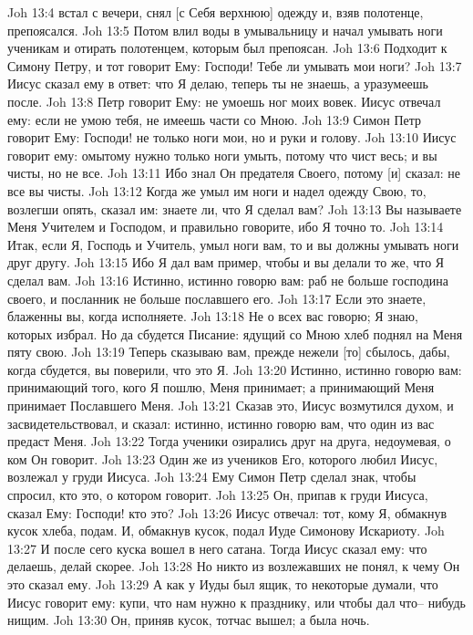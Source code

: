 Joh 13:4  встал с вечери, снял [с Себя верхнюю] одежду и, взяв полотенце, препоясался.
Joh 13:5  Потом влил воды в умывальницу и начал умывать ноги ученикам и отирать полотенцем, которым был препоясан.
Joh 13:6  Подходит к Симону Петру, и тот говорит Ему: Господи! Тебе ли умывать мои ноги?
Joh 13:7  Иисус сказал ему в ответ: что Я делаю, теперь ты не знаешь, а уразумеешь после.
Joh 13:8  Петр говорит Ему: не умоешь ног моих вовек. Иисус отвечал ему: если не умою тебя, не имеешь части со Мною.
Joh 13:9  Симон Петр говорит Ему: Господи! не только ноги мои, но и руки и голову.
Joh 13:10  Иисус говорит ему: омытому нужно только ноги умыть, потому что чист весь; и вы чисты, но не все.
Joh 13:11  Ибо знал Он предателя Своего, потому [и] сказал: не все вы чисты.
Joh 13:12  Когда же умыл им ноги и надел одежду Свою, то, возлегши опять, сказал им: знаете ли, что Я сделал вам?
Joh 13:13  Вы называете Меня Учителем и Господом, и правильно говорите, ибо Я точно то.
Joh 13:14  Итак, если Я, Господь и Учитель, умыл ноги вам, то и вы должны умывать ноги друг другу.
Joh 13:15  Ибо Я дал вам пример, чтобы и вы делали то же, что Я сделал вам.
Joh 13:16  Истинно, истинно говорю вам: раб не больше господина своего, и посланник не больше пославшего его.
Joh 13:17  Если это знаете, блаженны вы, когда исполняете.
Joh 13:18  Не о всех вас говорю; Я знаю, которых избрал. Но да сбудется Писание: ядущий со Мною хлеб поднял на Меня пяту свою.
Joh 13:19  Теперь сказываю вам, прежде нежели [то] сбылось, дабы, когда сбудется, вы поверили, что это Я.
Joh 13:20  Истинно, истинно говорю вам: принимающий того, кого Я пошлю, Меня принимает; а принимающий Меня принимает Пославшего Меня.
Joh 13:21  Сказав это, Иисус возмутился духом, и засвидетельствовал, и сказал: истинно, истинно говорю вам, что один из вас предаст Меня.
Joh 13:22  Тогда ученики озирались друг на друга, недоумевая, о ком Он говорит.
Joh 13:23  Один же из учеников Его, которого любил Иисус, возлежал у груди Иисуса.
Joh 13:24  Ему Симон Петр сделал знак, чтобы спросил, кто это, о котором говорит.
Joh 13:25  Он, припав к груди Иисуса, сказал Ему: Господи! кто это?
Joh 13:26  Иисус отвечал: тот, кому Я, обмакнув кусок хлеба, подам. И, обмакнув кусок, подал Иуде Симонову Искариоту.
Joh 13:27  И после сего куска вошел в него сатана. Тогда Иисус сказал ему: что делаешь, делай скорее.
Joh 13:28  Но никто из возлежавших не понял, к чему Он это сказал ему.
Joh 13:29  А как у Иуды был ящик, то некоторые думали, что Иисус говорит ему: купи, что нам нужно к празднику, или чтобы дал что-- нибудь нищим.
Joh 13:30  Он, приняв кусок, тотчас вышел; а была ночь.
